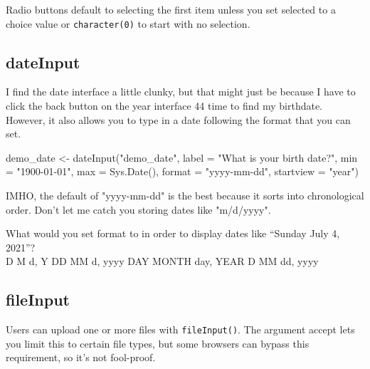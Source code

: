 \documentclass[
  oneside]{book}
\newenvironment{Shaded}{\begin{snugshade}}{\end{snugshade}}
\newcommand{\AttributeTok}[1]{\textcolor[rgb]{0.77,0.63,0.00}{#1}}
\newcommand{\FunctionTok}[1]{\textcolor[rgb]{0.00,0.00,0.00}{#1}}
\newcommand{\NormalTok}[1]{#1}
\newcommand{\OtherTok}[1]{\textcolor[rgb]{0.56,0.35,0.01}{#1}}
\newcommand{\StringTok}[1]{\textcolor[rgb]{0.31,0.60,0.02}{#1}}
\begin{document}
\begin{warning}
Radio buttons default to selecting the first item unless you set \AttributeTok{selected} to a choice value or \texttt{character(0)} to start with no selection.

\end{warning}

\hypertarget{dateinput}{%
\subsection{dateInput}\label{dateinput}}

I find the date interface a little clunky, but that might just be because I have to click the back button on the year interface 44 time to find my birthdate. However, it also allows you to type in a date following the format that you can set.

\begin{Shaded}
\begin{Highlighting}[]
\NormalTok{demo\_date }\OtherTok{\textless{}{-}} \FunctionTok{dateInput}\NormalTok{(}\StringTok{"demo\_date"}\NormalTok{, }\AttributeTok{label =} \StringTok{"What is your birth date?"}\NormalTok{, }\AttributeTok{min =} \StringTok{"1900{-}01{-}01"}\NormalTok{,}
    \AttributeTok{max =} \FunctionTok{Sys.Date}\NormalTok{(), }\AttributeTok{format =} \StringTok{"yyyy{-}mm{-}dd"}\NormalTok{, }\AttributeTok{startview =} \StringTok{"year"}\NormalTok{)}
\end{Highlighting}
\end{Shaded}

\begin{info}
IMHO, the default of \StringTok{"yyyy-mm-dd"} is the best because it sorts into chronological order. Don't let me catch you storing dates like \StringTok{"m/d/yyyy"}.

\end{info}

What would you set \AttributeTok{format} to in order to display dates like ``Sunday July 4, 2021''?\\
D M d, Y DD MM d, yyyy DAY MONTH day, YEAR D MM dd, yyyy

\hypertarget{fileinput}{%
\subsection{fileInput}\label{fileinput}}

Users can upload one or more files with \texttt{fileInput}\texttt{()}. The argument \AttributeTok{accept} lets you limit this to certain file types, but some browsers can bypass this requirement, so it's not fool-proof.
\end{document}
